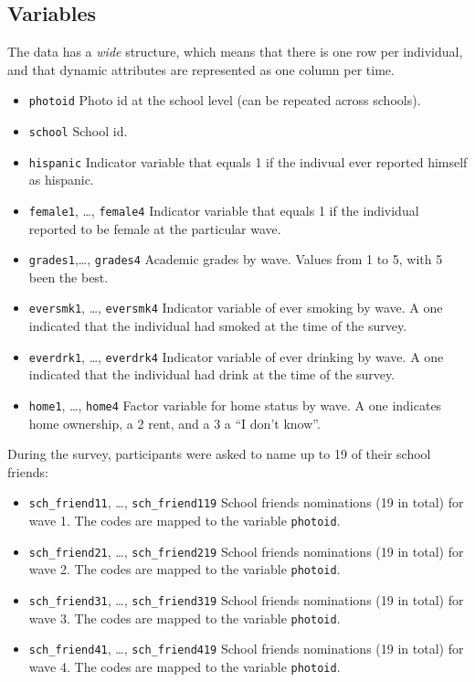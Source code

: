 \documentclass[]{book}
\begin{document}
\hypertarget{variables}{%
\subsection{Variables}\label{variables}}

The data has a \emph{wide} structure, which means that there is one row per individual,
and that dynamic attributes are represented as one column per time.

\begin{itemize}
\item
  \texttt{photoid} Photo id at the school level (can be repeated across schools).
\item
  \texttt{school} School id.
\item
  \texttt{hispanic} Indicator variable that equals 1 if the indivual ever reported
  himself as hispanic.
\item
  \texttt{female1}, \ldots{}, \texttt{female4} Indicator variable that equals 1 if the individual
  reported to be female at the particular wave.
\item
  \texttt{grades1},\ldots{}, \texttt{grades4} Academic grades by wave. Values from 1 to 5, with 5
  been the best.
\item
  \texttt{eversmk1}, \ldots{}, \texttt{eversmk4} Indicator variable of ever smoking by wave. A one
  indicated that the individual had smoked at the time of the survey.
\item
  \texttt{everdrk1}, \ldots{}, \texttt{everdrk4} Indicator variable of ever drinking by wave.
  A one indicated that the individual had drink at the time of the survey.
\item
  \texttt{home1}, \ldots{}, \texttt{home4} Factor variable for home status by wave. A one
  indicates home ownership, a 2 rent, and a 3 a ``I don't know''.
\end{itemize}

During the survey, participants were asked to name up to 19 of their school
friends:

\begin{itemize}
\item
  \texttt{sch\_friend11}, \ldots{}, \texttt{sch\_friend119} School friends nominations (19 in total)
  for wave 1. The codes are mapped to the variable \texttt{photoid}.
\item
  \texttt{sch\_friend21}, \ldots{}, \texttt{sch\_friend219} School friends nominations (19 in total)
  for wave 2. The codes are mapped to the variable \texttt{photoid}.
\item
  \texttt{sch\_friend31}, \ldots{}, \texttt{sch\_friend319} School friends nominations (19 in total)
  for wave 3. The codes are mapped to the variable \texttt{photoid}.
\item
  \texttt{sch\_friend41}, \ldots{}, \texttt{sch\_friend419} School friends nominations (19 in total)
  for wave 4. The codes are mapped to the variable \texttt{photoid}.
\end{itemize}
\end{document}
